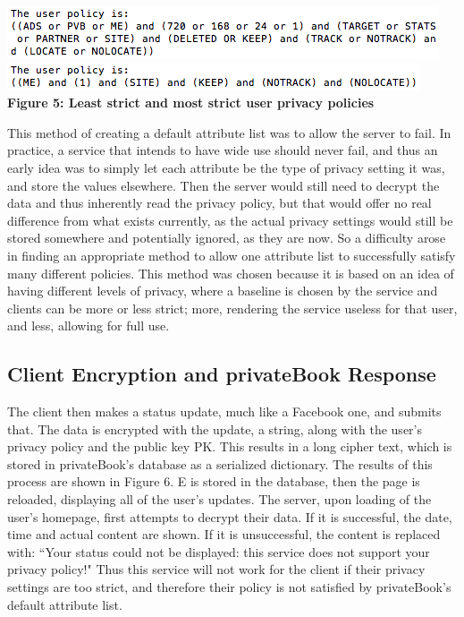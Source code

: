 \documentclass[12pt]{article}
\begin{document}
\begin{center}
\includegraphics[scale=.8]{policy.png} \\
\includegraphics[scale=.85]{policy2.png} \\
\textbf{Figure 5: Least strict and most strict user privacy policies}
\end{center}
This method of creating a default attribute list was to allow the server to fail. In practice, a service that intends to have wide use should never fail, and thus an early idea was to simply let each attribute be the type of privacy setting it was, and store the values elsewhere. Then the server would still need to decrypt the data and thus inherently read the privacy policy, but that would offer no real difference from what exists currently, as the actual privacy settings would still be stored somewhere and potentially ignored, as they are now. So a difficulty arose in finding an appropriate method to allow one attribute list to successfully satisfy many different policies. This method was chosen because it is based on an idea of having different levels of privacy, where a baseline is chosen by the service and clients can be more or less strict; more, rendering the service useless for that user, and less, allowing for full use.

\subsection{Client Encryption and privateBook Response}
The client then makes a status update, much like a Facebook one, and submits that. The data is encrypted with the update, a string, along with the user's privacy policy and the public key PK. This results in a long cipher text, which is stored in privateBook's database as a serialized dictionary. The results of this process are shown in Figure 6. E is stored in the database, then the page is reloaded, displaying all of the user's updates. The server, upon loading of the user's homepage, first attempts to decrypt their data. If it is successful, the date, time and actual content are shown. If it is unsuccessful, the content is replaced with: ``Your status could not be displayed: this service does not support your privacy policy!" Thus this service will not work for the client if their privacy settings are too strict, and therefore their policy is not satisfied by privateBook's default attribute list. 
\end{document}
